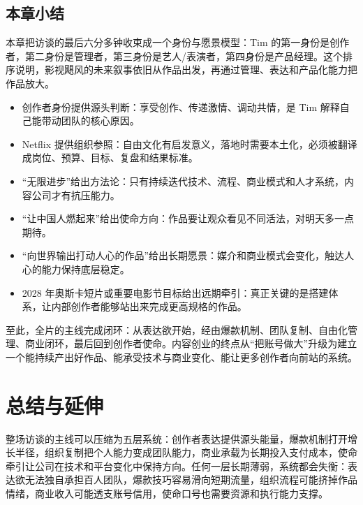 \documentclass[a4paper]{article}
\begin{document}
\subsection{本章小结}

本章把访谈的最后六分多钟收束成一个身份与愿景模型：Tim 的第一身份是创作者，第二身份是管理者，第三身份是艺人/表演者，第四身份是产品经理。这个排序说明，影视飓风的未来叙事依旧从作品出发，再通过管理、表达和产品化能力把作品放大。

\begin{itemize}
  \item 创作者身份提供源头判断：享受创作、传递激情、调动共情，是 Tim 解释自己能带动团队的核心原因。
  \item Netflix 提供组织参照：自由文化有启发意义，落地时需要本土化，必须被翻译成岗位、预算、目标、复盘和结果标准。
  \item “无限进步”给出方法论：只有持续迭代技术、流程、商业模式和人才系统，内容公司才有抗压能力。
  \item “让中国人燃起来”给出使命方向：作品要让观众看见不同活法，对明天多一点期待。
  \item “向世界输出打动人心的作品”给出长期愿景：媒介和商业模式会变化，触达人心的能力保持底层稳定。
  \item 2028 年奥斯卡短片或重要电影节目标给出远期牵引：真正关键的是搭建体系，让内部创作者能够站出来完成更高规格的作品。
\end{itemize}

至此，全片的主线完成闭环：从表达欲开始，经由爆款机制、团队复制、自由化管理、商业闭环，最后回到创作者使命。内容创业的终点从“把账号做大”升级为建立一个能持续产出好作品、能承受技术与商业变化、能让更多创作者向前站的系统。

\section{总结与延伸}

整场访谈的主线可以压缩为五层系统：创作者表达提供源头能量，爆款机制打开增长半径，组织复制把个人能力变成团队能力，商业承载为长期投入支付成本，使命牵引让公司在技术和平台变化中保持方向。任何一层长期薄弱，系统都会失衡：表达欲无法独自承担百人团队，爆款技巧容易滑向短期流量，组织流程可能挤掉作品情绪，商业收入可能透支账号信用，使命口号也需要资源和执行能力支撑。
\end{document}
